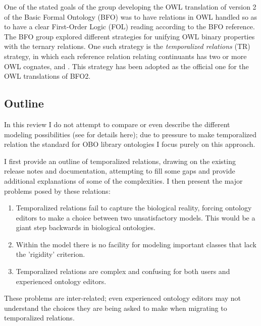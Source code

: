 \documentclass{bioinfo}
\begin{document}
One of the stated goals of the group developing the OWL translation of
version 2 of the Basic Formal Ontology (BFO)\cite{Grenon2004} was to
have relations in OWL handled so as to have a clear First-Order Logic
(FOL) reading according to the BFO reference\cite{BFO2Ref}. The BFO
group explored different strategies for unifying OWL binary properties
with the ternary relations\cite{Grewe}.  One such strategy is the
\emph{temporalized relations} (TR) strategy, in which each reference
relation relating continuants has two or more OWL cognates,
 and . This strategy has
been adopted as the official one for the OWL translations of
BFO2\cite{Graz}.

\subsection{Outline}

In this review I do not attempt to compare or even describe the
different modeling possibilities (see \cite{Grewe} for details here);
due to pressure to make temporalized relation the standard for OBO
library ontologies I focus purely on this approach.

I first provide an outline of temporalized relations, drawing on the
existing release notes and documentation, attempting to fill some gaps
and provide additional explanations of some of the complexities. I
then present the major problems posed by these relations:

\begin{enumerate}

\item Temporalized relations fail to capture the biological reality,
  forcing ontology editors to make a choice between two unsatisfactory
  models. This would be a giant step backwards in biological
  ontologies.

\item Within the model there is no facility for modeling important classes that lack
  the 'rigidity' criterion.

\item Temporalized relations are complex and confusing for both users
  and experienced ontology editors.

\end{enumerate}

These problems are inter-related; even experienced ontology editors
may not understand the choices they are being asked to make when
migrating to temporalized relations.
\end{document}
